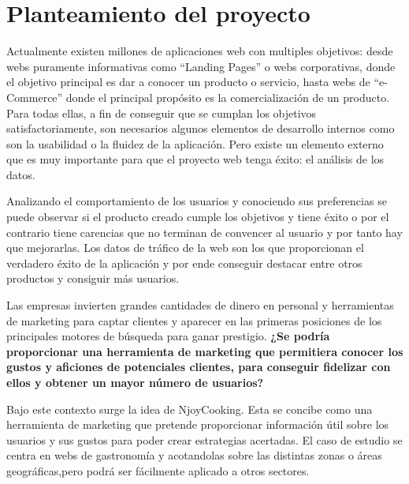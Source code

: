 \section{Planteamiento del proyecto}

Actualmente existen millones de aplicaciones web con multiples objetivos: desde webs puramente informativas como ``Landing Pages'' o webs
corporativas, donde el objetivo principal es dar a conocer un producto o servicio, hasta webs de ``e-Commerce'' donde el principal propósito
es la comercialización de un producto. Para todas ellas, a fin de conseguir que se cumplan los objetivos satisfactoriamente, son necesarios algunos
elementos de desarrollo internos como son la usabilidad o la fluidez de la aplicación. Pero existe un elemento externo que es muy importante para que
el proyecto web tenga éxito: el análisis de los datos.


Analizando el comportamiento de los usuarios y conociendo sus preferencias se puede observar si el producto creado cumple los objetivos y tiene éxito o
por el contrario tiene carencias que no terminan de convencer al usuario y por tanto hay que mejorarlas. Los datos de tráfico de la web son los que
proporcionan el verdadero éxito de la aplicación y por ende conseguir destacar entre otros productos y consiguir más usuarios.


Las empresas invierten grandes cantidades de dinero en personal y herramientas de marketing para captar clientes y aparecer en las primeras posiciones
de los principales motores de búsqueda para ganar prestigio. \textbf{¿Se podría proporcionar una herramienta de marketing que
permitiera conocer los gustos y aficiones de potenciales clientes, para conseguir fidelizar con ellos y obtener un mayor número de usuarios?}



Bajo este contexto surge la idea de NjoyCooking. Esta se concibe como una herramienta de marketing que pretende proporcionar información útil
sobre los usuarios y sus gustos para poder crear estrategias acertadas. El caso de estudio se centra en webs de gastronomía y acotandolas sobre
las distintas zonas o áreas geográficas,pero podrá ser fácilmente aplicado a otros sectores.
